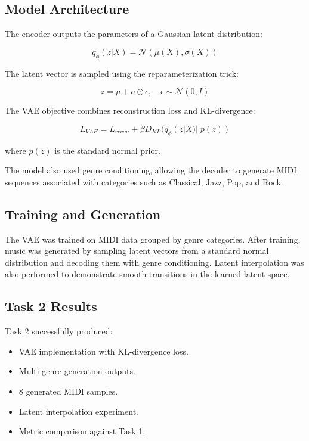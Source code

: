\documentclass[conference]{IEEEtran}
\begin{document}
\subsection{Model Architecture}

The encoder outputs the parameters of a Gaussian latent distribution:

\begin{equation}
q_{\phi}(z|X) = \mathcal{N}(\mu(X), \sigma(X))
\end{equation}

The latent vector is sampled using the reparameterization trick:

\begin{equation}
z = \mu + \sigma \odot \epsilon, \quad \epsilon \sim \mathcal{N}(0, I)
\end{equation}

The VAE objective combines reconstruction loss and KL-divergence:

\begin{equation}
L_{VAE} = L_{recon} + \beta D_{KL}(q_{\phi}(z|X)||p(z))
\end{equation}

where $p(z)$ is the standard normal prior.

The model also used genre conditioning, allowing the decoder to generate MIDI sequences associated with categories such as Classical, Jazz, Pop, and Rock.
\subsection{Training and Generation}

The VAE was trained on MIDI data grouped by genre categories. After training, music was generated by sampling latent vectors from a standard normal distribution and decoding them with genre conditioning. Latent interpolation was also performed to demonstrate smooth transitions in the learned latent space.

\subsection{Task 2 Results}

Task 2 successfully produced:

\begin{itemize}
    \item VAE implementation with KL-divergence loss.
    \item Multi-genre generation outputs.
    \item 8 generated MIDI samples.
    \item Latent interpolation experiment.
    \item Metric comparison against Task 1.
\end{itemize}
\end{document}
